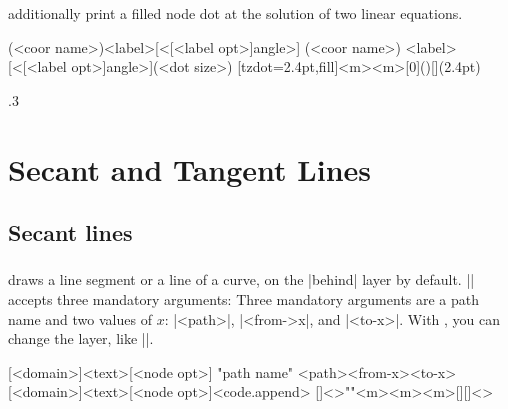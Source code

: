 \icmd{\tzLFnXpoint*} additionally print a filled node dot at the solution of two linear equations.

\begin{tzdef}{}
\tzLFnXpoint{<\fn>}{<\fn>}
\tzLFnXpoint{<\fn>}{<\fn>}(<coor name>){<label>}[<[<label opt>]angle>]
\tzLFnXpoint[<opt>]{<\fn>}{<\fn>}(<coor name>)
            {<label>}[<[<label opt>]angle>](<dot size>)
  [tzdot=2.4pt,fill]{<m>}{<m>}[0](){}[](2.4pt)
\end{tzdef}

\begin{tzcode}{.3}
\end{tzcode}



\chapter{Secant and Tangent Lines}
\label{c:tangent}

\section{Secant lines}
\label{s:secant}

\subsection{\protect\cmd{\tzsecantat}}
\label{ss:tzsecantat}

\icmd{\tzsecantat} draws a line segment or a  line of a curve, on the |behind| layer by default.
|\tzsecantat| accepts three mandatory arguments: 
Three mandatory arguments are a path name and two values of $x$: |{<path>}|, |{<from->x}|, and |{<to-x>}|.
With \icmd{\settzsecantlayer}, you can change the layer, like ||.

\begin{tzdef}{}
[<domain>]{<text>}[<node opt>]
"path name"
           {<path>}{<from-x>}{<to-x>}[<domain>]{<text>}[<node opt>]<code.append>
  []<>""{<m>}{<m>}{<m>}[]{}[]<>
\end{tzdef}

